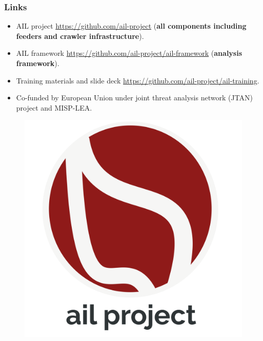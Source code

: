 \documentclass{beamer}
\begin{document}
\begin{frame}
\frametitle{Links}
    \begin{itemize}
        \item AIL project \url{https://github.com/ail-project} ({\bf all components including feeders and crawler infrastructure}).
        \item AIL framework \url{https://github.com/ail-project/ail-framework} ({\bf analysis framework}).
        \item Training materials and slide deck \url{https://github.com/ail-project/ail-training}.
        \item Co-funded by European Union under joint threat analysis network (JTAN) project and MISP-LEA.
    \end{itemize}
    \begin{figure}
        \includegraphics[scale=0.10, angle=0]{images/ail-project.png}
    \end{figure}
\end{frame}
\end{document}
